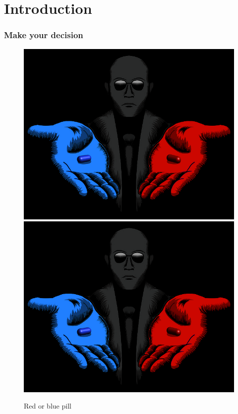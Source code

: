 \section*{Introduction}
\begin{frame}[fragile]
    \frametitle{Make your decision}
    \begin{figure}
        \begin{center}
            {
                \includegraphics[height=0.70\textheight,keepaspectratio]{./images/Decision.jpg}
            }
            {
                \includegraphics[height=0.67\textheight,keepaspectratio]{./images/Decision.jpg}
            }
            \caption{Red or blue pill\footnotemark}
        \end{center}
    \end{figure}

\end{frame}

